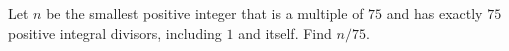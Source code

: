 Let $n$ be the smallest positive integer that is a multiple of $75$ and has exactly $75$ positive integral divisors, including $1$ and itself. Find $n/75$.